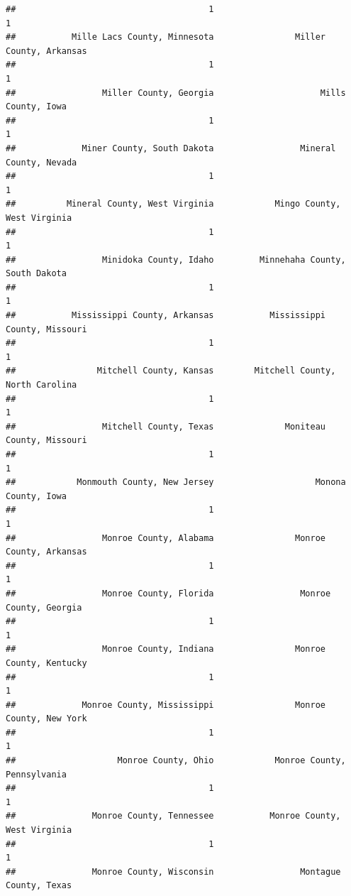 \documentclass[
]{article}
\begin{document}
\begin{verbatim}
##                                      1                                      1 
##           Mille Lacs County, Minnesota                Miller County, Arkansas 
##                                      1                                      1 
##                 Miller County, Georgia                     Mills County, Iowa 
##                                      1                                      1 
##             Miner County, South Dakota                 Mineral County, Nevada 
##                                      1                                      1 
##          Mineral County, West Virginia            Mingo County, West Virginia 
##                                      1                                      1 
##                 Minidoka County, Idaho         Minnehaha County, South Dakota 
##                                      1                                      1 
##           Mississippi County, Arkansas           Mississippi County, Missouri 
##                                      1                                      1 
##                Mitchell County, Kansas        Mitchell County, North Carolina 
##                                      1                                      1 
##                 Mitchell County, Texas              Moniteau County, Missouri 
##                                      1                                      1 
##            Monmouth County, New Jersey                    Monona County, Iowa 
##                                      1                                      1 
##                 Monroe County, Alabama                Monroe County, Arkansas 
##                                      1                                      1 
##                 Monroe County, Florida                 Monroe County, Georgia 
##                                      1                                      1 
##                 Monroe County, Indiana                Monroe County, Kentucky 
##                                      1                                      1 
##             Monroe County, Mississippi                Monroe County, New York 
##                                      1                                      1 
##                    Monroe County, Ohio            Monroe County, Pennsylvania 
##                                      1                                      1 
##               Monroe County, Tennessee           Monroe County, West Virginia 
##                                      1                                      1 
##               Monroe County, Wisconsin                 Montague County, Texas 

\end{verbatim}
\end{document}
